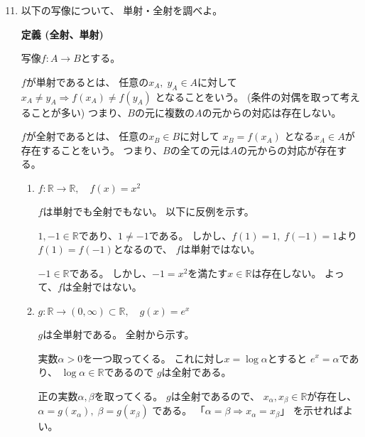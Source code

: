 \documentclass[12pt,b5paper]{ltjsarticle}
\begin{document}
\hrulefill

\renewcommand{\theenumi}{問題 \arabic{enumi}}
\begin{enumerate}
 \setcounter{enumi}{10}
 \item
      以下の写像について、
      単射・全射を調べよ。

      \dotfill

      \textbf{定義 (全射、単射)}

      写像$f:A\to B$とする。

      $f$が単射であるとは、
      任意の$x_A,\;y_A \in A$に対して
      $x_A \ne y_A \Rightarrow f(x_{A}) \ne f(y_{A})$
      となることをいう。
      (条件の対偶を取って考えることが多い)
      つまり、$B$の元に複数の$A$の元からの対応は存在しない。

      $f$が全射であるとは、
      任意の$x_B \in B$に対して
      $x_B = f(x_{A})$
      となる$x_{A}\in A$が存在することをいう。
      つまり、$B$の全ての元は$A$の元からの対応が存在する。

      \dotfill

      \begin{enumerate}
       \item $f:\mathbb{R}\to\mathbb{R},\quad f(x)=x^{2}$

             $f$は単射でも全射でもない。
             以下に反例を示す。

             $1,-1\in\mathbb{R}$であり、$1\ne -1$である。
             しかし、$f(1)=1,\;f(-1)=1$より$f(1)=f(-1)$となるので、
             $f$は単射ではない。

             $-1\in\mathbb{R}$である。
             しかし、$-1=x^{2}$を満たす$x\in\mathbb{R}$は存在しない。
             よって、$f$は全射ではない。

             \dotfill

       \item $g:\mathbb{R}\to(0,\infty) \subset \mathbb{R},\quad g(x)=e^{x}$

             $g$は全単射である。
             全射から示す。

             実数$\alpha >0$を一つ取ってくる。
             これに対し$x=\log{\alpha}$とすると
             $e^{x}=\alpha$であり、
             $\log{\alpha} \in \mathbb{R}$であるので
             $g$は全射である。

             正の実数$\alpha,\beta$を取ってくる。
             $g$は全射であるので、
             $x_{\alpha},x_{\beta} \in\mathbb{R}$が存在し、
             $\alpha = g(x_{\alpha}), \; \beta=g(x_{\beta})$
             である。
             「$\alpha = \beta \Rightarrow x_{\alpha}=x_{\beta}$」
             を示せればよい。


\end{enumerate}
\end{enumerate}
\end{document}
